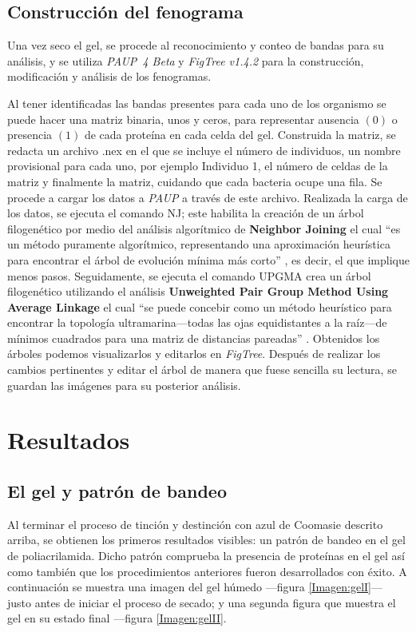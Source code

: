 \documentclass[%
 reprint,
 amsmath,amssymb,
 aps,
showkeys,
letter,
12pts
]{revtex4-1}
\begin{document}
	\subsection{\label{sec:Fen}Construcción del fenograma}	
		Una vez seco el gel, se procede al reconocimiento y conteo de bandas para su análisis, y se utiliza \textit{PAUP\ 4 Beta} y \textit{FigTree v1.4.2} para la construcción, modificación y análisis de los fenogramas.
		
		Al tener identificadas las bandas presentes para cada uno de los organismo se puede hacer una matriz binaria, unos y ceros, para representar ausencia $\left(0\right)$ o presencia $\left(1\right)$ de cada proteína en cada celda del gel. Construida la matriz, se redacta un archivo .nex en el que se incluye el número de individuos, un nombre provisional para cada uno, por ejemplo Individuo 1, el número de celdas de la matriz y finalmente la matriz, cuidando que cada bacteria ocupe una fila. Se procede a cargar los datos a \textit{PAUP} a través de este archivo. Realizada la carga de los datos, se ejecuta el comando NJ; este habilita la creación de un árbol filogenético por medio del análisis algorítmico de \textbf{Neighbor Joining} el cual “es un método puramente algorítmico, representando una aproximación heurística para encontrar el árbol de evolución mínima más corto” \cite{metodos}, es decir, el que implique menos pasos. Seguidamente, se ejecuta el comando UPGMA crea un árbol filogenético utilizando el análisis \textbf{Unweighted Pair Group Method Using Average Linkage} el cual “se puede concebir como un método heurístico para encontrar la topología ultramarina---todas las ojas equidistantes a la raíz---de mínimos cuadrados para una matriz de distancias pareadas” \cite{metodos}. Obtenidos los árboles podemos visualizarlos y editarlos en \textit{FigTree}. Después de realizar los cambios pertinentes y editar el árbol de manera que fuese sencilla su lectura, se guardan las imágenes para su posterior análisis.	
	
\section{\label{sec:Resul}Resultados} %
	\subsection{El gel y patrón de bandeo}
		Al terminar el proceso de tinción y destinción con azul de Coomasie descrito arriba, se obtienen los primeros resultados visibles: un patrón de bandeo en el gel de poliacrilamida. Dicho patrón comprueba la presencia de proteínas en el gel así como también que los procedimientos anteriores fueron desarrollados con éxito. A continuación se muestra una imagen del gel húmedo ---figura \ref{Imagen:gelI}--- justo antes de iniciar el proceso de secado; y una segunda figura que muestra el gel en su estado final ---figura \ref{Imagen:gelII}.
		
\end{document}
